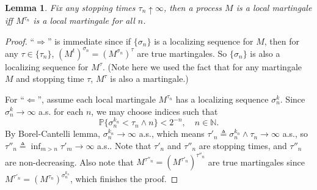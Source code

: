 \documentclass[10pt,twocolumn]{article}
\newtheorem{lemma}{Lemma}
\begin{document}
\begin{lemma}
	Fix any stopping times $\tau_n\uparrow\infty$, then a process $M$ is a local martingale iff $M^{\tau_n}$ is a local martingale for all $n$.
\end{lemma}
\begin{proof}
	``$\Rightarrow$'' is immediate since if $\{\sigma_n\}$ is a localizing sequence for $M$, then for any $\tau\in\{\tau_n\}$, $(M^t)^{\sigma_n} = (M^{\sigma_n})^\tau$ are true martingales.
	So $\{\sigma_n\}$ is also a localizing sequence for $M^\tau$.
	(Note here we used the fact that for any martingale $M$ and stopping time $\tau$, $M^\tau$ is also a martingale.)
	
	For ``$\Leftarrow$'', assume each local martingale $M^{\tau_n}$ has a localizing sequence $\sigma_n^k$.
	Since $\sigma_n^k\to\infty$ a.s. for each $n$, we may choose indices such that
	\begin{equation*}
		\mathbb{P}\{\sigma_n^{k_n} < \tau_n \wedge n \} < 2^{-n}, \quad n\in\mathbb{N}.
	\end{equation*}
	By Borel-Cantelli lemma, $\sigma_n^{k_n}\to\infty$ a.s., which means $\tau'_n \triangleq \sigma_n^{k_n}\wedge\tau_n \to \infty$ a.s., so $\tau''_n \triangleq \inf_{m>n}\tau'_m \to \infty$ a.s..
	Note that $\tau'_n$ and $\tau''_n$ are stopping times, and $\tau''_n$ are non-decreasing.
	Also note that $M^{\tau''_n} = (M^{\tau'_n})^{\tau''_n}$ are true martingales since $M^{\tau'_n} = (M^{\tau_n})^{\sigma_n^{k_n}}$, which finishes the proof.
\end{proof}
\end{document}
